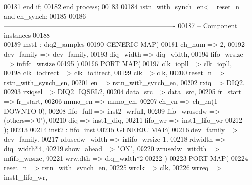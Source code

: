 \begin{DoxyCode}
00181         \textcolor{keywordflow}{end} \textcolor{keywordflow}{if};
00182     \textcolor{keywordflow}{end} \textcolor{keywordflow}{process};
00183  
00184 \textcolor{vhdlchar}{rstn_with_synch_en}\textcolor{vhdlchar}{<=} \textcolor{vhdlchar}{reset_n} \textcolor{keywordflow}{and}  \textcolor{vhdlchar}{en_synch};
00185 
00186 \textcolor{keyword}{-- ----------------------------------------------------------------------------}
00187 \textcolor{keyword}{-- Component instances}
00188 \textcolor{keyword}{-- ----------------------------------------------------------------------------}
00189 inst1 : diq2_samples
00190 \textcolor{keywordflow}{GENERIC} \textcolor{keywordflow}{MAP}(
00191             ch_num      => \textcolor{vhdllogic}{2},
00192             dev_family  => dev_family,
00193             diq_width   => diq_width,
00194             fifo_wrsize => infifo_wrsize
00195             \textcolor{vhdlchar}{)}
00196 \textcolor{keywordflow}{PORT} \textcolor{keywordflow}{MAP}(
00197         clk_iopll       => clk_iopll,
00198         clk_iodirect    => clk_iodirect,
00199         clk             => clk,
00200         reset_n         => rstn_with_synch_en,
00201         en                  => rstn_with_synch_en,
00202         rxiq                => DIQ2,
00203         rxiqsel         => DIQ2_IQSEL2,
00204         data_src            => data_src,
00205         fr_start        => fr_start,
00206         mimo_en         => mimo_en,
00207         ch_en               => ch_en\textcolor{vhdlchar}{(}\textcolor{vhdllogic}{1} \textcolor{keywordflow}{DOWNTO} \textcolor{vhdllogic}{0}\textcolor{vhdlchar}{)},
00208         fifo_full       => inst2_wrfull,
00209         fifo_wrusedw    => \textcolor{vhdlchar}{(}\textcolor{keywordflow}{others}=>'0'\textcolor{vhdlchar}{)},
00210         diq                 => inst1_diq,
00211         fifo_wr             => inst1_fifo_wr
00212 \textcolor{vhdlchar}{)};
00213 
00214 inst2 : fifo_inst
00215 \textcolor{keywordflow}{GENERIC} \textcolor{keywordflow}{MAP}(
00216             dev_family      => dev_family,
00217             rdusedw_width   => infifo_wrsize-\textcolor{vhdllogic}{1},
00218             rdwidth             => diq\_width*4,
00219             show_ahead      => \textcolor{keyword}{"ON"},
00220             wrusedw_witdth => infifo_wrsize,
00221             wrwidth             => diq\_width*2
00222             \textcolor{vhdlchar}{)}
00223 \textcolor{keywordflow}{PORT} \textcolor{keywordflow}{MAP}(
00224             reset_n             => rstn_with_synch_en,
00225             wrclk           => clk,
00226             wrreq           => inst1_fifo_wr,

\end{DoxyCode}
